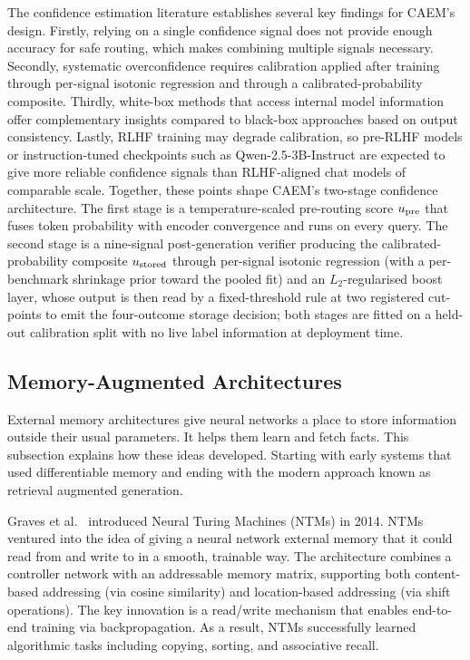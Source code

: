 The confidence estimation literature establishes several key findings for CAEM's design. Firstly, relying on a single confidence signal does not provide enough accuracy for safe routing, which makes combining multiple signals necessary. Secondly, systematic overconfidence requires calibration applied after training through per-signal isotonic regression and through a calibrated-probability composite. Thirdly, white-box methods that access internal model information offer complementary insights compared to black-box approaches based on output consistency. Lastly, RLHF training may degrade calibration, so pre-RLHF models or instruction-tuned checkpoints such as Qwen-2.5-3B-Instruct are expected to give more reliable confidence signals than RLHF-aligned chat models of comparable scale. Together, these points shape CAEM's two-stage confidence architecture. The first stage is a temperature-scaled pre-routing score $u_{\text{pre}}$ that fuses token probability with encoder convergence and runs on every query. The second stage is a nine-signal post-generation verifier producing the calibrated-probability composite $u_{\text{stored}}$ through per-signal isotonic regression (with a per-benchmark shrinkage prior toward the pooled fit) and an $L_{2}$-regularised boost layer, whose output is then read by a fixed-threshold rule at two registered cut-points to emit the four-outcome storage decision; both stages are fitted on a held-out calibration split with no live label information at deployment time.

\subsection{Memory-Augmented Architectures}

External memory architectures give neural networks a place to store information outside their usual parameters. It  helps them learn and fetch facts. This subsection explains how these ideas developed. Starting with early systems that used differentiable memory and ending with the modern approach known as retrieval augmented generation.

Graves et al.\ \cite{graves2014neural} introduced Neural Turing Machines (NTMs) in 2014. NTMs ventured into the idea of giving a neural network external memory that it could read from and write to in a smooth, trainable way. The architecture combines a controller network with an addressable memory matrix, supporting both content-based addressing (via cosine similarity) and location-based addressing (via shift operations). The key innovation is a read/write mechanism that enables end-to-end training via backpropagation. As a result, NTMs successfully learned algorithmic tasks including copying, sorting, and associative recall.

